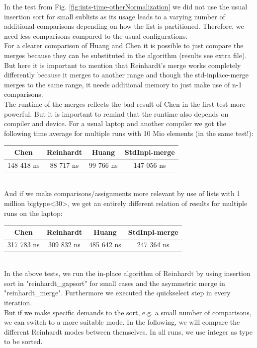 \documentclass[11pt,pdftex,a4paper, twocolumn]{article}
\begin{document}
In the test from Fig. \ref{fig:ints-time-otherNormalization} we did not use the usual insertion sort for small sublists as its usage leads to a varying number of additional comparisons depending on how the list is partitioned. Therefore, we need less comparisons compared to the usual configurations. \\ %
For a clearer comparison of Huang and Chen it is possible to just compare the merges because they can be substituted in the algorithm (results see extra file). But here it is important to mention that Reinhardt’s merge works completely differently because it merges to another range and though the std-inplace-merge merges to the same range, it needs additional memory to just make use of n-1 comparisons. \\
The runtime of the merges reflects the bad result of Chen in the first test more powerful. But it is important to remind that the runtime also depends on compiler and device. For a usual laptop and another compiler we got the following time average for multiple runs with 10 Mio elements (in the same test!): \\
\scriptsize
\begin{tabular}{|c|c|c|c|} \hline
Chen & Reinhardt & Huang & StdInpl-merge \\ \hline
148 418 ns & 88 717 ns & 99 766 ns & 147 056 ns \\ \hline
\end{tabular}
\normalsize \\
And if we make comparisons/assignments more relevant by use of lists with 1 million bigtype<30>, we get an entirely different relation of results for multiple runs on the laptop: \\
\scriptsize
\begin{tabular}{|c|c|c|c|} \hline
Chen & Reinhardt & Huang & StdInpl-merge \\ \hline
317 783 ns & 309 832 ns & 485 642 ns & 247 364 ns \\ \hline
\end{tabular}
\normalsize \\
In the above tests, we run the in-place algorithm of Reinhardt by using insertion sort in "reinhardt\_gapsort" for small cases and the asymmetric merge in "reinhardt\_merge". Furthermore we executed the quickselect step in every iteration. \\
But if we make specific demands to the sort, e.g. a small number of comparisons, we can switch to a more suitable mode. In the following, we will compare the different Reinhardt modes between themselves. In all runs, we use integer as type to be sorted. \\
\end{document}
